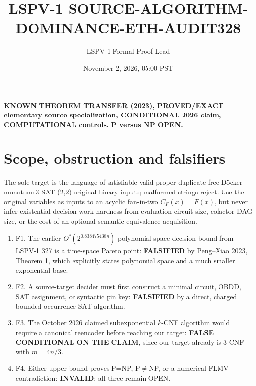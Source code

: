 \documentclass[11pt]{article}
\title{LSPV-1 SOURCE-ALGORITHM-DOMINANCE-ETH-AUDIT328}
\author{LSPV-1 Formal Proof Lead}
\date{November 2, 2026, 05:00 PST}
\begin{document}
\maketitle
\noindent\textbf{KNOWN THEOREM TRANSFER (2023), PROVED/EXACT elementary source specialization, CONDITIONAL 2026 claim, COMPUTATIONAL controls. P versus NP OPEN.}
\section{Scope, obstruction and falsifiers}
The sole target is the language of satisfiable valid proper duplicate-free D\"ocker monotone 3-SAT-(2,2) original binary inputs; malformed strings reject. Use the original variables as inputs to an acyclic fan-in-two $C_F(x)=F(x)$, but never infer existential decision-work hardness from evaluation circuit size, cofactor DAG size, or the cost of an optional semantic-equivalence acquisition.
\begin{enumerate}
\item[] F1. The earlier $O^*(2^{0.838475438n})$ polynomial-space decision bound from LSPV-1 327 is a time-space Pareto point: \textbf{FALSIFIED} by Peng--Xiao 2023, Theorem 1, which explicitly states polynomial space and a much smaller exponential base.
\item[] F2. A source-target decider must first construct a minimal circuit, OBDD, SAT assignment, or syntactic pin key: \textbf{FALSIFIED} by a direct, charged bounded-occurrence SAT algorithm.
\item[] F3. The October 2026 claimed subexponential $k$-CNF algorithm would require a canonical reencoder before reaching our target: \textbf{FALSE CONDITIONAL ON THE CLAIM}, since our target already is 3-CNF with $m=4n/3$.
\item[] F4. Either upper bound proves P=NP, P$\ne$NP, or a numerical FLMV contradiction: \textbf{INVALID}; all three remain OPEN.
\end{enumerate}
\end{document}
